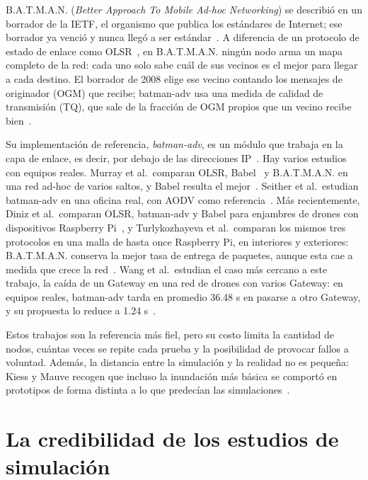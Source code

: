 B.A.T.M.A.N. (\textit{Better Approach To Mobile Ad-hoc Networking}) se describió
en un borrador de la IETF, el organismo que publica los estándares de Internet; ese
borrador ya venció y nunca llegó a ser estándar~\cite{Neumann2008Batman}. A
diferencia de un protocolo de estado de enlace como OLSR~\cite{Clausen2003OLSR},
en B.A.T.M.A.N. ningún nodo arma un mapa completo de la red: cada uno solo sabe
cuál de sus vecinos es el mejor para llegar a cada destino. El borrador de 2008
elige ese vecino contando los mensajes de originador (OGM) que recibe; batman-adv
usa una medida de calidad de transmisión (TQ), que sale de la fracción de OGM
propios que un vecino recibe bien~\cite{Seither2011BatmanAdv}.

Su implementación de referencia, \textit{batman-adv}, es un módulo que trabaja en
la capa de enlace, es decir, por debajo de las direcciones
IP~\cite{OpenMesh2024Batmanadv}. Hay varios estudios con equipos reales. Murray et
al.\ comparan OLSR, Babel~\cite{Chroboczek2021Babel} y B.A.T.M.A.N. en una red
ad-hoc de varios saltos, y Babel resulta el mejor~\cite{Murray2010Experimental}.
Seither et al.\ estudian batman-adv en una oficina real, con AODV como
referencia~\cite{Seither2011BatmanAdv}. Más recientemente, Diniz et al.\ comparan
OLSR, batman-adv y Babel para enjambres de drones con dispositivos Raspberry
Pi~\cite{Diniz2025Uav}, y Turlykozhayeva et al.\ comparan los mismos tres
protocolos en una malla de hasta once Raspberry Pi, en interiores y exteriores:
B.A.T.M.A.N. conserva la mejor tasa de entrega de paquetes, aunque esta cae a medida
que crece la red~\cite{Turlykozhayeva2024Proactive}. Wang et al.\ estudian el caso
más cercano a este trabajo, la caída de un Gateway en una red de drones con varios
Gateway: en equipos reales, batman-adv tarda en promedio 36.48 s en pasarse a otro
Gateway, y su propuesta lo reduce a 1.24 s~\cite{Wang2026QGSwitch}.

Estos trabajos son la referencia más fiel, pero su costo limita la cantidad de
nodos, cuántas veces se repite cada prueba y la posibilidad de provocar fallos a
voluntad. Además, la distancia entre la simulación y la realidad no es pequeña:
Kiess y Mauve recogen que incluso la inundación más básica se comportó en
prototipos de forma distinta a lo que predecían las
simulaciones~\cite{Kiess2007RealWorld}.

\section{La credibilidad de los estudios de simulación}
\label{sec:credibilidad}

